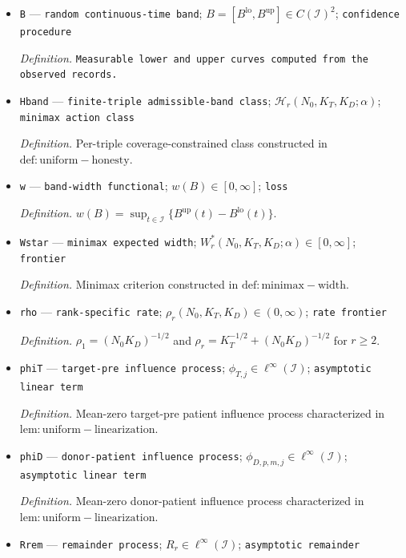 \documentclass{article}
\begin{document}
\begin{itemize}
  \item \texttt{B} --- \texttt{random continuous-\allowbreak{}time band}; \(B=[B^{\mathrm{lo}},B^{\mathrm{up}}]\in C(\mathcal I)^2\); \texttt{confidence procedure}
  \par\smallskip\noindent\emph{Definition.} \texttt{Measurable lower and upper curves computed from the observed records.}
  \item \texttt{Hband} --- \texttt{finite-\allowbreak{}triple admissible-\allowbreak{}band class}; \(\mathcal H_r(N_0,K_T,K_D;\alpha)\); \texttt{minimax action class}
  \par\smallskip\noindent\emph{Definition.} Per-triple coverage-constrained class constructed in \(\mathrm{def:uniform-honesty}\).
  \item \texttt{w} --- \texttt{band-\allowbreak{}width functional}; \(w(B)\in[0,\infty]\); \texttt{loss}
  \par\smallskip\noindent\emph{Definition.} \(w(B)=\sup_{t\in\mathcal I}\{B^{\mathrm{up}}(t)-B^{\mathrm{lo}}(t)\}\).
  \item \texttt{Wstar} --- \texttt{minimax expected width}; \(W_r^*(N_0,K_T,K_D;\alpha)\in[0,\infty]\); \texttt{frontier}
  \par\smallskip\noindent\emph{Definition.} Minimax criterion constructed in \(\mathrm{def:minimax-width}\).
  \item \texttt{rho} --- \texttt{rank-\allowbreak{}specific rate}; \(\rho_r(N_0,K_T,K_D)\in(0,\infty)\); \texttt{rate frontier}
  \par\smallskip\noindent\emph{Definition.} \(\rho_1=(N_0K_D)^{-1/2}\) and \(\rho_r=K_T^{-1/2}+(N_0K_D)^{-1/2}\) for \(r\ge2\).
  \item \texttt{phiT} --- \texttt{target-\allowbreak{}pre influence process}; \(\phi_{T,j}\in\ell^\infty(\mathcal I)\); \texttt{asymptotic linear term}
  \par\smallskip\noindent\emph{Definition.} Mean-zero target-pre patient influence process characterized in \(\mathrm{lem:uniform-linearization}\).
  \item \texttt{phiD} --- \texttt{donor-\allowbreak{}patient influence process}; \(\phi_{D,p,m,j}\in\ell^\infty(\mathcal I)\); \texttt{asymptotic linear term}
  \par\smallskip\noindent\emph{Definition.} Mean-zero donor-patient influence process characterized in \(\mathrm{lem:uniform-linearization}\).
  \item \texttt{Rrem} --- \texttt{remainder process}; \(R_r\in\ell^\infty(\mathcal I)\); \texttt{asymptotic remainder}

\end{itemize}
\end{document}
